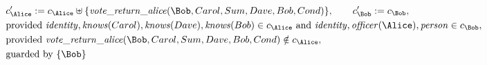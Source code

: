 \begin{align*}
&
c'_
{
\Alice
}
 := 
c_
{
\Alice
}
 \uplus 
\{
\mathit{\detokenize{
vote_return_alice
}}
(
\Bob
,
Carol
,
Sum
,
Dave
,
Bob
,
Cond
)
\}
, \qquad 
c'_
{
\Bob
}
 := 
c_
{
\Bob
}
,\\
&
\text{provided } 
\mathit{\detokenize{
identity
}}
,
\mathit{\detokenize{
knows
}}
(
Carol
)
,
\mathit{\detokenize{
knows
}}
(
Dave
)
,
\mathit{\detokenize{
knows
}}
(
Bob
)
 \in c_
{
\Alice
}
 \text{ and } 
\mathit{\detokenize{
identity
}}
,
\mathit{\detokenize{
officer
}}
(
\Alice
)
,
\mathit{\detokenize{
person
}}
 \in c_
{
\Bob
}
,\\
&
\text{provided } 
\mathit{\detokenize{
vote_return_alice
}}
(
\Bob
,
Carol
,
Sum
,
Dave
,
Bob
,
Cond
)
 \notin c_
{
\Alice
}
,\\
&
\text{guarded by } \{
\Bob
\}
\end{align*}

